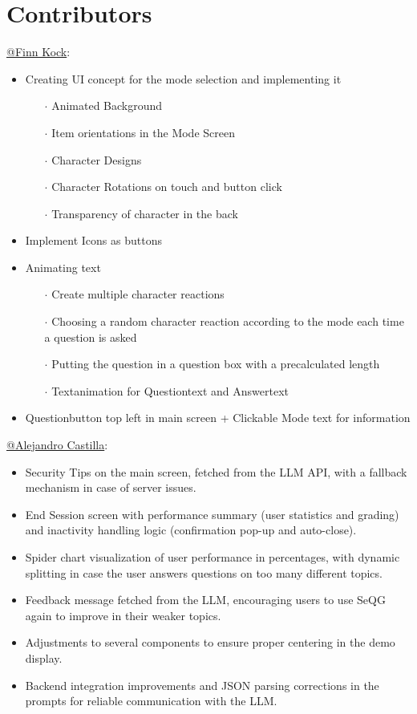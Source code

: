 \chapter{Contributors}

\href{https://github.com/finnkock}{@Finn Kock}: 
\begin{itemize}
	\item Creating UI concept for the mode selection and implementing it
    \begin{itemize}[nosep]
        \item[$\cdot$] Animated Background
	    \item[$\cdot$] Item orientations in the Mode Screen
	    \item[$\cdot$]  Character Designs
	    \item[$\cdot$] Character Rotations on touch and button click
	    \item[$\cdot$] Transparency of character in the back
    \end{itemize}
	\item Implement Icons as buttons
	\item Animating text 
	\begin{itemize}[nosep]
        \item[$\cdot$] Create multiple character reactions
        \item[$\cdot$] Choosing a random character reaction according to the mode each time a question is asked
        \item[$\cdot$] Putting the question in a question box with a precalculated length
        \item[$\cdot$] Textanimation for Questiontext and Answertext
	\end{itemize}
    \item Questionbutton top left in main screen + Clickable Mode text for information 
\end{itemize}

\href{https://github.com/alecasbar}{@Alejandro Castilla}: 
\begin{itemize}
    \item Security Tips on the main screen, fetched from the LLM API, with a fallback mechanism in case of server issues.
    \item End Session screen with performance summary (user statistics and grading) and inactivity handling logic (confirmation pop-up and auto-close).
    \item Spider chart visualization of user performance in percentages, with dynamic splitting in case the user answers questions on too many different topics.
    \item Feedback message fetched from the LLM, encouraging users to use SeQG again to improve in their weaker topics.
    \item Adjustments to several components to ensure proper centering in the demo display.
    \item Backend integration improvements and JSON parsing corrections in the prompts for reliable communication with the LLM.
\end{itemize}

